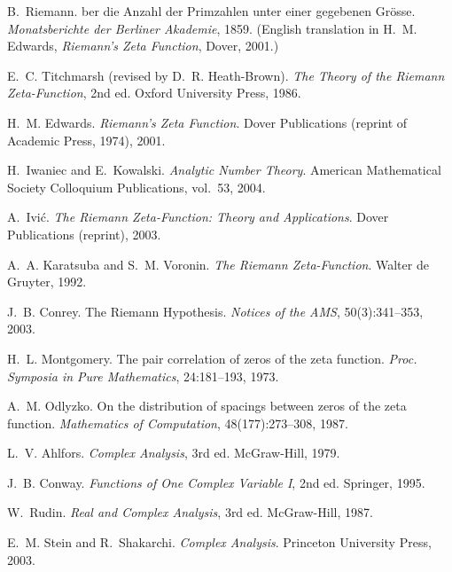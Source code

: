 \documentclass[11pt]{article}
\theoremstyle{plain}
\theoremstyle{definition}
\begin{document}
\begin{thebibliography}{99}

B.~Riemann.
ber die Anzahl der Primzahlen unter einer gegebenen Gr{\"o}sse.
\newblock \emph{Monatsberichte der Berliner Akademie}, 1859.
\newblock (English translation in H.~M. Edwards, \emph{Riemann's Zeta Function}, Dover, 2001.)

E.~C. Titchmarsh (revised by D.~R. Heath-Brown).
\newblock \emph{The Theory of the Riemann Zeta-Function}, 2nd ed.
\newblock Oxford University Press, 1986.

H.~M. Edwards.
\newblock \emph{Riemann's Zeta Function}.
\newblock Dover Publications (reprint of Academic Press, 1974), 2001.

H.~Iwaniec and E.~Kowalski.
\newblock \emph{Analytic Number Theory}.
\newblock American Mathematical Society Colloquium Publications, vol.~53, 2004.

A.~Ivi{\'c}.
\newblock \emph{The Riemann Zeta-Function: Theory and Applications}.
\newblock Dover Publications (reprint), 2003.

A.~A. Karatsuba and S.~M. Voronin.
\newblock \emph{The Riemann Zeta-Function}.
\newblock Walter de Gruyter, 1992.

J.~B. Conrey.
\newblock The Riemann Hypothesis.
\newblock \emph{Notices of the AMS}, 50(3):341--353, 2003.

H.~L. Montgomery.
\newblock The pair correlation of zeros of the zeta function.
\newblock \emph{Proc. Symposia in Pure Mathematics}, 24:181--193, 1973.

A.~M. Odlyzko.
\newblock On the distribution of spacings between zeros of the zeta function.
\newblock \emph{Mathematics of Computation}, 48(177):273--308, 1987.

L.~V. Ahlfors.
\newblock \emph{Complex Analysis}, 3rd ed.
\newblock McGraw-Hill, 1979.

J.~B. Conway.
\newblock \emph{Functions of One Complex Variable I}, 2nd ed.
\newblock Springer, 1995.

W.~Rudin.
\newblock \emph{Real and Complex Analysis}, 3rd ed.
\newblock McGraw-Hill, 1987.

E.~M. Stein and R.~Shakarchi.
\newblock \emph{Complex Analysis}.
\newblock Princeton University Press, 2003.


\end{thebibliography}
\end{document}
